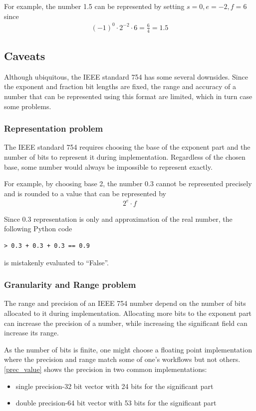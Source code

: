 \documentclass[10pt]{article}
\begin{document}
For example, the number 1.5 can be represented by setting $s=0, e=-2, f=6$ since
\begin{align*}
  {(-1)}^{0} \cdot 2^{-2} \cdot 6 = \frac{6}{4} = 1.5
\end{align*}

\subsection{Caveats}\label{sec:floatscaveats}

Although ubiquitous, the IEEE standard 754 has some several downsides. Since the
exponent and fraction bit lengths are fixed, the range and accuracy of a number
that can be represented using this format are limited, which in turn case some
problems.

\subsubsection{Representation problem}\label{sec:accuracyproblem}

The IEEE standard 754 requires choosing the base of the exponent part and the
number of bits to represent it during implementation. Regardless of the chosen
base, some number would always be impossible to represent exactly.

For example, by choosing base 2, the number $0.3$ cannot be represented
precisely and is rounded to a value that can be represented by
\begin{align*}
  {2}^{e}\cdot f
\end{align*}

Since $0.3$ representation is only and approximation of the real number, the
following Python code
\begin{verbatim}
> 0.3 + 0.3 + 0.3 == 0.9
\end{verbatim}
is mistakenly evaluated to ``False''.

\subsubsection{Granularity and Range problem}\label{sec:gran-range-probl}

The range and precision of an IEEE 754 number depend on the number of bits
allocated to it during implementation.
Allocating more bits to the exponent part can increase the precision of a
number, while increasing the significant field can increase its range.

As the number of bits is finite, one might choose a floating point
implementation where the precision and range match some of one's workflows but
not others. \ref{prec_value} shows the precision in two common implementations:
\begin{itemize}
  \item single precision-32 bit vector with 24 bits for the significant part
  \item double precision-64 bit vector with 53 bits for the significant part
\end{itemize}
\end{document}
